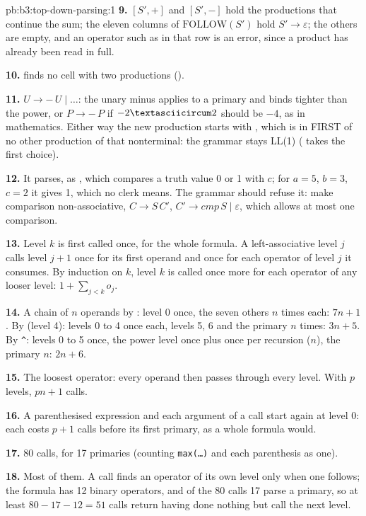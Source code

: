 \begin{solution}{pb:b3:top-down-parsing:1}
\textbf{9.} $[S', +]$ and $[S', -]$ hold the productions that continue the sum; the eleven columns of $\mathrm{FOLLOW}(S')$ hold $S' \to \varepsilon$; the others are empty, and an operator such as \code{*} in that row is an error, since a product has already been read in full.

\textbf{10.}  finds no cell with two productions ().

\textbf{11.} $U \to -\,U \mid \dots$: the unary minus applies to a primary and binds tighter than the power, or $P \to -\,P$ if $-2\textasciicircum2$ should be $-4$, as in mathematics. Either way the new production starts with \code{-}, which is in FIRST of no other production of that nonterminal: the grammar stays LL(1) ( takes the first choice).

\textbf{12.} It parses, as , which compares a truth value 0 or 1 with $c$; for $a = 5$, $b = 3$, $c = 2$ it gives 1, which no clerk means. The grammar should refuse it: make comparison non-associative, $C \to S\,C'$, $C' \to \mathit{cmp}\,S \mid \varepsilon$, which allows at most one comparison.

\textbf{13.} Level $k$ is first called once, for the whole formula. A left-associative level $j$ calls level $j + 1$ once for its first operand and once for each operator of level $j$ it consumes. By induction on $k$, level $k$ is called once more for each operator of any looser level: $1 + \sum_{j<k} o_j$.

\textbf{14.} A chain of $n$ operands by : level 0 once, the seven others $n$ times each: $7n + 1$. By \code{+} (level 4): levels 0 to 4 once each, levels 5, 6 and the primary $n$ times: $3n + 5$. By \texttt{\textasciicircum}: levels 0 to 5 once, the power level once plus once per recursion ($n$), the primary $n$: $2n + 6$.

\textbf{15.} The loosest operator: every operand then passes through every level. With $p$ levels, $pn + 1$ calls.

\textbf{16.} A parenthesised expression and each argument of a call start again at level 0: each costs $p + 1$ calls before its first primary, as a whole formula would.

\textbf{17.} 80 calls, for 17 primaries (counting \texttt{max(\dots)} and each parenthesis as one).

\textbf{18.} Most of them. A call finds an operator of its own level only when one follows; the formula has 12 binary operators, and of the 80 calls 17 parse a primary, so at least $80 - 17 - 12 = 51$ calls return having done nothing but call the next level.


\end{solution}

